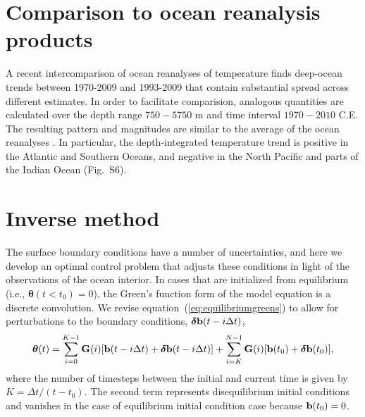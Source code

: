 \documentclass[12pt]{article}
\begin{document}
\section{Comparison to ocean reanalysis products}

A recent intercomparison of ocean reanalyses of temperature
\cite{Palmer-Roberts-2017:Ocean} finds deep-ocean trends between
1970-2009 and 1993-2009 that contain substantial spread across
different estimates. In order to facilitate comparision, analogous
quantities are calculated over the depth range $750-5750$ m and time
interval $1970-2010$ C.E.  The resulting pattern and magnitudes are
similar to the average of the ocean reanalyses
\cite{Palmer-Roberts-2017:Ocean}.  In particular, the depth-integrated
temperature trend is positive in the Atlantic and Southern Oceans, and
negative in the North Pacific and parts of the Indian Ocean (Fig.~S6).

\section{Inverse method}

The surface boundary conditions have a number of uncertainties, and
here we develop an optimal control problem that adjusts these
conditions in light of the observations of the ocean interior. In
cases that are initialized from equilibrium (i.e.,
${\boldsymbol \theta}(t<t_0)=0$), the Green's function form of the
model equation is a discrete convolution. We revise
equation~(\ref{eq:equilibriumgreens}) to allow for perturbations to
the boundary conditions, ${\boldsymbol \delta}{\bf b}(t-i{\Delta}t)$,
\begin{equation}
  \label{eq:disequilibriumgreens}
  {\boldsymbol \theta}(t) = \sum^{K-1}_{i=0} {\bf G}(i) [{\bf b} (t - i \Delta t) +  {\boldsymbol \delta}{\bf b}(t-i{\Delta}t)] + \sum^{N-1}_{i=K} {\bf G}(i) [{\bf b} (t_0) +  {\boldsymbol \delta}{\bf b}(t_0)],  
\end{equation}
where the number of timesteps between the initial and current time is
given by $K={\Delta}t/(t-t_0)$.  The second term represents
disequilibrium initial conditions and vanishes in the case of
equilibrium initial condition case because ${\bf b}(t_0)=0$.
\end{document}
